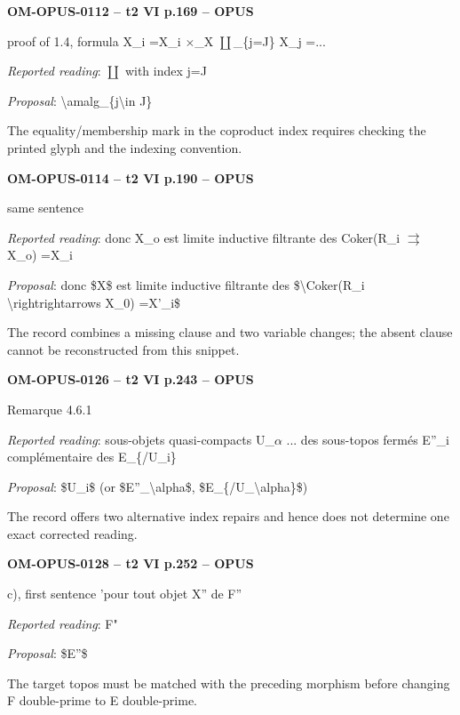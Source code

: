 \par\noindent\textbf{OM-OPUS-0112 -- t2 VI p.169 -- OPUS}\par
proof of 1.4, formula X\_i =\allowbreak  X\_i \ensuremath{\times}\_X \ensuremath{\coprod}\_\{j=\allowbreak J\} X\_j =\allowbreak  ...\par
\emph{Reported reading}: \ensuremath{\coprod} with index j=\allowbreak J\par
\emph{Proposal}: \textbackslash{}amalg\_\{j\textbackslash{}in J\}\par
The equality/membership mark in the coproduct index requires checking the printed glyph and the indexing convention.\par
\par\noindent\textbf{OM-OPUS-0114 -- t2 VI p.190 -- OPUS}\par
same sentence\par
\emph{Reported reading}: donc X\_o est limite inductive filtrante des Coker(R\_i \ensuremath{\rightrightarrows} X\_o) =\allowbreak  X\_i\par
\emph{Proposal}: donc \$X\$ est limite inductive filtrante des \$\textbackslash{}Coker(R\_i \textbackslash{}rightrightarrows X\_0) =\allowbreak  X'\_i\$\par
The record combines a missing clause and two variable changes; the absent clause cannot be reconstructed from this snippet.\par
\par\noindent\textbf{OM-OPUS-0126 -- t2 VI p.243 -- OPUS}\par
Remarque 4.6.1\par
\emph{Reported reading}: sous-objets quasi-compacts U\_\ensuremath{\alpha} ... des sous-topos fermés E''\_i complémentaire des E\_\{/U\_i\}\par
\emph{Proposal}: \$U\_i\$ (or \$E''\_\textbackslash{}alpha\$, \$E\_\{/U\_\textbackslash{}alpha\}\$)\par
The record offers two alternative index repairs and hence does not determine one exact corrected reading.\par
\par\noindent\textbf{OM-OPUS-0128 -- t2 VI p.252 -- OPUS}\par
c), first sentence 'pour tout objet X'' de F''\par
\emph{Reported reading}: F"\par
\emph{Proposal}: \$E''\$\par
The target topos must be matched with the preceding morphism before changing F double-prime to E double-prime.\par
